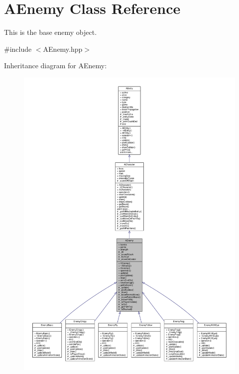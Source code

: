 \hypertarget{class_a_enemy}{}\section{A\+Enemy Class Reference}
\label{class_a_enemy}


This is the base enemy object.  




{\ttfamily \#include $<$A\+Enemy.\+hpp$>$}



Inheritance diagram for A\+Enemy\+:
\nopagebreak
\begin{figure}[H]
\begin{center}
\leavevmode
\includegraphics[width=350pt]{class_a_enemy__inherit__graph}
\end{center}
\end{figure}


